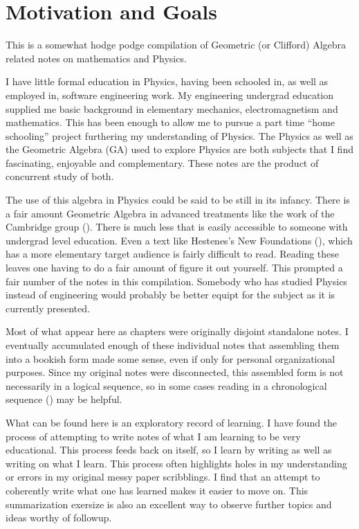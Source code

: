 \chapter*{Motivation and Goals}\normalsize

This is a somewhat hodge podge compilation of Geometric (or Clifford) Algebra related notes on mathematics and Physics.

I have little formal education in Physics, having been schooled in, as well as employed in, software engineering work.  My engineering undergrad education supplied me basic background in elementary mechanics, electromagnetism and mathematics.  This has been enough to allow me to pursue a part time ``home schooling'' project furthering my understanding of Physics.  The Physics as well as the Geometric Algebra (GA) used to explore Physics are both subjects that I find fascinating, enjoyable and complementary.  These notes are the product of concurrent study of both.

The use of this algebra in Physics could be said to be still in its infancy.  There is a fair amount Geometric Algebra in advanced treatments like the work of the Cambridge group (\cite{doran2003gap}).  There is much less that is easily accessible to someone with undergrad level education.  Even a text like Hestenes's New Foundations (\cite{hestenes1999nfc}), which has a more elementary target audience is fairly difficult to read.  Reading these leaves one having to do a fair amount of figure it out yourself.  This prompted a fair number of the notes in this compilation.  Somebody who has studied Physics instead of engineering would probably be better equipt for the subject as it is currently presented.

Most of what appear here as chapters were originally disjoint standalone notes.  I eventually accumulated enough of these individual notes that assembling them into a bookish form made some sense, even if only for personal organizational purposes.  Since my original notes were disconnected, this assembled form is not necessarily in a logical sequence, so in some cases reading in a chronological sequence () may be helpful.

What can be found here is an exploratory record of learning.  I have found the process of attempting to write notes of what I am learning to be very educational.  This process feeds back on itself, so I learn by writing as well as writing on what I learn.  This process often highlights holes in my understanding or errors in my original messy paper scribblings.  I find that an attempt to coherently write what one has learned makes it easier to move on.  This summarization exersize is also an excellent way to observe further topics and ideas worthy of followup.

